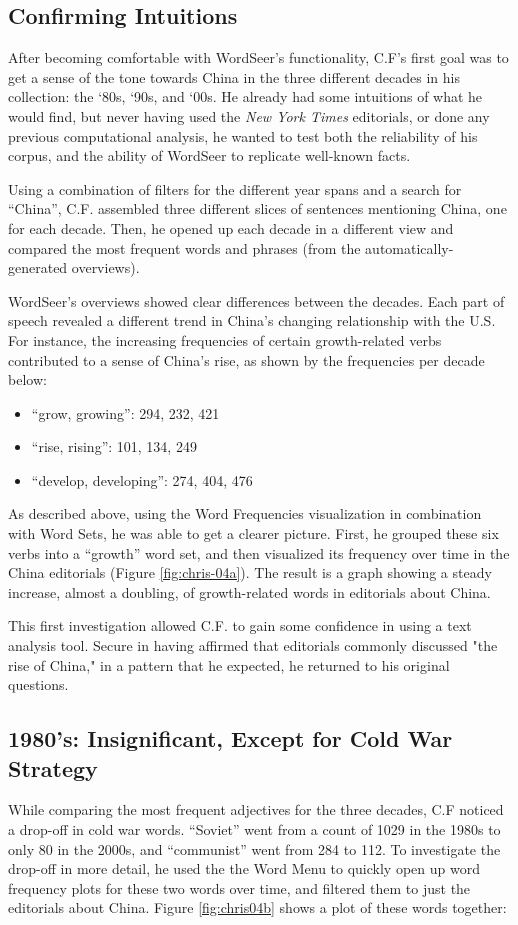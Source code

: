 \documentclass{sig-alternate}
\begin{document}
\subsection{Confirming Intuitions}
After becoming comfortable with WordSeer's functionality, C.F's first goal was to get a sense of the tone towards China in the three different decades in his collection: the `80s, `90s, and `00s.  He already had some intuitions of what he would find, but never having used the \emph{New York Times} editorials, or done any previous computational analysis, he wanted to test both the reliability of his corpus, and the ability of WordSeer to replicate well-known facts.

Using a combination of filters for the different year spans and a search for ``China'', C.F. assembled three different slices of sentences mentioning China, one for each decade. Then, he opened up each decade in a different view and compared the most frequent words and phrases (from the automatically-generated overviews).

WordSeer's overviews showed clear differences between the decades. Each part of speech revealed a different trend in China's changing relationship with the U.S. 
For instance, the increasing  frequencies of certain growth-related verbs contributed to a sense of China's rise, as shown by the frequencies per decade below:
\begin{itemize}
\item ``grow, growing'':  294, 232, 421
\item ``rise, rising'': 101, 134, 249
\item ``develop, developing'': 274, 404, 476
\end{itemize}
As described above, using the Word Frequencies visualization in combination with Word Sets, he was able to get a clearer picture. First, he grouped these six verbs into a ``growth'' word set, and then visualized its frequency over time in the China editorials (Figure \ref{fig:chris-04a}).  The result is a graph showing a steady increase, almost a doubling, of growth-related words in editorials about China.

This first investigation allowed C.F. to gain some confidence in using a text analysis tool. Secure in having affirmed that editorials commonly discussed "the rise of China," in a pattern that he expected, he returned to his original questions.

\subsection{1980's: Insignificant, Except for Cold War Strategy}
While comparing the most frequent adjectives for the three decades, C.F noticed a drop-off in cold war words. ``Soviet''  went from  a count of 1029 in the 1980s to only 80 in the 2000s, and ``communist'' went from 284 to 112.   To investigate the drop-off in more detail, he used the the Word Menu to quickly open up word frequency plots for these two words over time, and filtered them to just the editorials about China.  Figure \ref{fig:chris04b} shows a plot of these words together:
\end{document}
